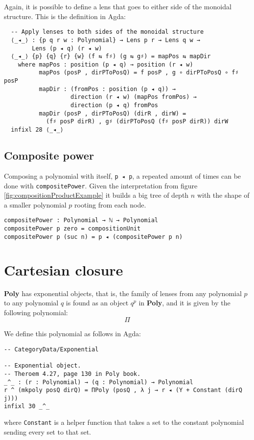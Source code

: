 Again, it is possible to define a lens that goes to either side of the monoidal structure. This is the definition in Agda:

\begin{verbatim}
  -- Apply lenses to both sides of the monoidal structure
  ⟨_◂_⟩ : {p q r w : Polynomial} → Lens p r → Lens q w → 
        Lens (p ◂ q) (r ◂ w)
  ⟨_◂_⟩ {p} {q} {r} {w} (f ⇆ f♯) (g ⇆ g♯) = mapPos ⇆ mapDir
    where mapPos : position (p ◂ q) → position (r ◂ w)
          mapPos (posP , dirPToPosQ) = f posP , g ∘ dirPToPosQ ∘ f♯ posP
          mapDir : (fromPos : position (p ◂ q)) → 
                   direction (r ◂ w) (mapPos fromPos) → 
                   direction (p ◂ q) fromPos
          mapDir (posP , dirPToPosQ) (dirR , dirW) = 
            (f♯ posP dirR) , g♯ (dirPToPosQ (f♯ posP dirR)) dirW
  infixl 28 ⟨_◂_⟩
\end{verbatim}

\subsection{Composite power}
Composing a polynomial with itself, \texttt{p ◂ p}, a repeated amount of times can be done with \texttt{compositePower}.
Given the interpretation from figure \ref{fig:compositionProductExample} it builds a big tree of depth $n$ with the shape of a smaller polynomial $p$ rooting from each node.

\begin{verbatim}
compositePower : Polynomial → ℕ → Polynomial
compositePower p zero = compositionUnit
compositePower p (suc n) = p ◂ (compositePower p n) 
\end{verbatim}

\section{Cartesian closure}

\textbf{Poly} has exponential objects, that is, the family of lenses from any polynomial $p$ to any polynomial $q$ is found as an object $q^p$ in \textbf{Poly}, and it is given by the following polynomial:
$$
\Pi
$$

We define this polynomial as follows in Agda:
\begin{verbatim}
-- CategoryData/Exponential

-- Exponential object.
-- Theroem 4.27, page 130 in Poly book.
_^_ : (r : Polynomial) → (q : Polynomial) → Polynomial
r ^ (mkpoly posQ dirQ) = ΠPoly (posQ , λ j → r ◂ (Y + Constant (dirQ j)))
infixl 30 _^_
\end{verbatim}
where \texttt{Constant} is a helper function that takes a set to the constant polynomial sending every set to that set.

